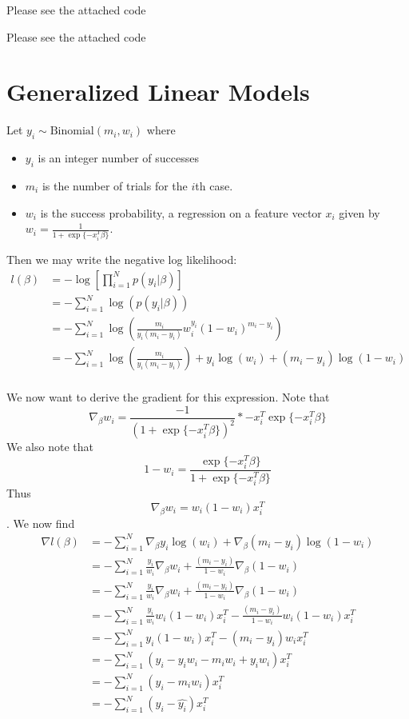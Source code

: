 \documentclass[12pt]{article}
\newenvironment{problem}[2][Exercise]{\begin{trivlist}
\item[\hskip \labelsep {\bfseries #1}\hskip \labelsep {\bfseries #2.}]}{\end{trivlist}}
\begin{document}
\begin{problem}{C}
Please see the attached code
\end{problem}

\begin{problem}{D}
Please see the attached code
\end{problem}

\section*{Generalized Linear Models}

\begin{problem}{A}
Let $y_i \sim \text{Binomial}(m_i, w_i)$ where
\begin{itemize}
    \item $y_i$ is an integer number of successes
    \item $m_i$ is the number of trials for the $i$th case.
    \item $w_i$ is the success probability, a regression on a feature vector $x_i$ given by $w_i = \frac{1}{1 + \exp\{-x_i^T\beta\}}$.
\end{itemize}

Then we may write the negative log likelihood:
\begin{align*}
l(\beta) &= -\log \left[\prod_{i=1}^Np(y_i|\beta)\right]\\
&= - \sum_{i=1}^N \log(p(y_i|\beta))\\
&= - \sum_{i=1}^N \log(\frac{m_i}{y_i(m_i - y_i)}w_i^{y_i}(1-w_i)^{m_i-y_i})\\
&= - \sum_{i=1}^N \log(\frac{m_i}{y_i(m_i - y_i)}) + y_i\log(w_i) + (m_i - y_i)\log(1-w_i)\\
\end{align*}

We now want to derive the gradient for this expression.
Note that $$\nabla_\beta w_i = \frac{-1}{(1+\exp\{-x_i^T\beta\})^2}*-x_i^T\exp\{-x_i^T\beta\}$$
We also note that $$1 - w_i = \frac{\exp\{-x_i^T\beta\}}{1+\exp\{-x_i^T\beta\}}$$
Thus $$\nabla_\beta w_i = w_i(1-w_i)x_i^T$$.
We now find
\begin{align*}
\nabla l(\beta) &= -\sum_{i=1}^N \nabla_\beta y_i\log(w_i) + \nabla_\beta (m_i-y_i)\log(1-w_i)\\
&= -\sum_{i=1}^N \frac{y_i}{w_i}\nabla_\beta w_i + \frac{(m_i-y_i)}{1-w_i}\nabla_\beta (1-w_i)\\
&= -\sum_{i=1}^N \frac{y_i}{w_i}\nabla_\beta w_i + \frac{(m_i-y_i)}{1-w_i}\nabla_\beta(1- w_i)\\
&= -\sum_{i=1}^N \frac{y_i}{w_i}w_i(1-w_i)x_i^T- \frac{(m_i-y_i)}{1-w_i}w_i(1-w_i)x_i^T\\
&=-\sum_{i=1}^N y_i(1-w_i)x_i^T- (m_i-y_i)w_ix_i^T\\
&= -\sum_{i=1}^N (y_i - y_iw_i -m_iw_i + y_iw_i)x_i^T\\
&= -\sum_{i=1}^N (y_i - m_iw_i)x_i^T\\
&= -\sum_{i=1}^N (y_i - \hat{y_i})x_i^T
\end{align*}
\end{problem}
\end{document}

